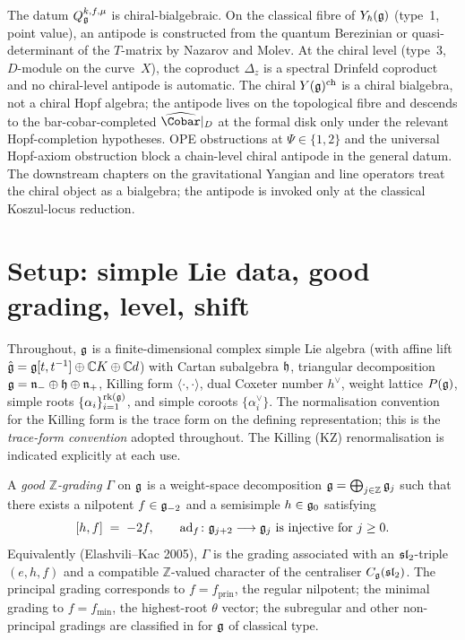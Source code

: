 \begin{remark}
\label{rem:ucqg-bialgebra-not-hopf}
The datum $Q^{k,f,\mu}_{\mathfrak{g}}$ is chiral-bialgebraic.  On the classical
fibre of $Y_{\hbar}(\mathfrak{g})$ (type~1, point value), an antipode is
constructed from the quantum Berezinian or quasi-determinant of the
$T$-matrix by Nazarov and Molev.  At the chiral level (type~3,
$D$-module on the curve~$X$), the coproduct $\Delta_z$ is a spectral
Drinfeld coproduct and no chiral-level antipode is automatic. The
chiral $Y(\mathfrak{g})^{\mathrm{ch}}$ is a chiral bialgebra, not a chiral Hopf
algebra; the antipode lives on the topological fibre and descends to
the bar-cobar-completed $\widehat{\Cobar}|_D$ at the formal disk only
under the relevant Hopf-completion hypotheses. OPE obstructions at
$\Psi\in\{1,2\}$ and the universal Hopf-axiom obstruction block a
chain-level chiral antipode in the general datum. The downstream
chapters on the gravitational Yangian and line operators treat the
chiral object as a bialgebra; the antipode is invoked only at the
classical Koszul-locus reduction.
\end{remark}

\section{Setup: simple Lie data, good grading, level, shift}
\label{sec:ucqg-setup}

Throughout, $\mathfrak{g}$ is a finite-dimensional complex simple
Lie algebra (with affine lift $\hat{\mathfrak{g}} = \mathfrak{g}[t,t^{-1}]\oplus
\mathbb{C} K \oplus \mathbb{C} d$) with Cartan subalgebra $\mathfrak{h}$,
triangular decomposition $\mathfrak{g} = \mathfrak{n}_{-}\oplus \mathfrak{h}\oplus \mathfrak{n}_{+}$,
Killing form $\langle\cdot,\cdot\rangle$, dual Coxeter number
$h^{\vee}$, weight lattice $P(\mathfrak{g})$, simple roots
$\{\alpha_i\}_{i=1}^{\mathrm{rk}(\mathfrak{g})}$, and simple coroots
$\{\alpha_i^{\vee}\}$. The normalisation convention for the Killing
form is the trace form on the defining representation; this is the
\emph{trace-form convention} adopted throughout. The Killing (KZ)
renormalisation is indicated explicitly at each use.

\begin{definition}
\label{def:good-grading}
A \emph{good $\mathbb{Z}$-grading} $\Gamma$ on $\mathfrak{g}$ is a weight-space
decomposition $\mathfrak{g} = \bigoplus_{j\in\mathbb{Z}}\mathfrak{g}_j$ such that there
exists a nilpotent $f\in\mathfrak{g}_{-2}$ and a semisimple $h\in\mathfrak{g}_0$
satisfying
\[
 [h, f] \;=\; -2f, \qquad
 \mathrm{ad}_f\colon \mathfrak{g}_{j+2}\longrightarrow\mathfrak{g}_j
 \text{ is injective for $j\ge 0$.}
\]
Equivalently (Elashvili--Kac 2005), $\Gamma$ is the grading
associated with an $\mathfrak{sl}_2$-triple $(e,h,f)$ and a compatible
$\mathbb{Z}$-valued character of the centraliser
$C_{\mathfrak{g}}(\mathfrak{sl}_2)$. The principal grading corresponds to
$f = f_{\mathrm{prin}}$, the regular nilpotent; the minimal grading to
$f = f_{\mathrm{min}}$, the highest-root $\theta$ vector; the subregular
and other non-principal gradings are classified in
\cite{ElashviliKac05} for $\mathfrak{g}$ of classical type.
\end{definition}

